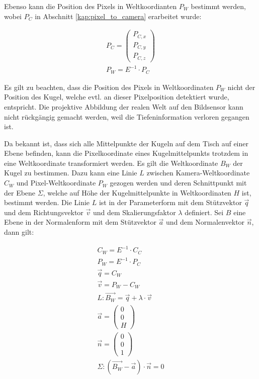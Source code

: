 Ebenso kann die Position des Pixels in Weltkoordianten $P_W$ bestimmt werden, wobei $P_C$
in Abschnitt \ref{kap:pixel_to_camera} erarbeitet wurde:

\begin{align}
P_C = \begin{pmatrix}P_{C,x}\\P_{C,y}\\P_{C,z}\end{pmatrix}\\
P_W = E^{-1} \cdot P_C
\end{align}

Es gilt zu beachten, dass die Position des Pixels in Weltkoordinaten $P_W$ nicht der Position des Kugel, welche evtl. an
dieser Pixelposition detektiert wurde, entspricht. Die projektive Abbildung der realen Welt auf den Bildsensor kann
nicht rückgängig gemacht werden, weil die Tiefeninformation verloren gegangen ist.

Da bekannt ist, dass sich alle Mittelpunkte der Kugeln auf dem Tisch auf einer Ebene befinden, kann die Pixelkoordinate
eines Kugelmittelpunkts trotzdem in eine Weltkoordinate transformiert werden.
Es gilt die Weltkoordinate $B_W$ der Kugel zu bestimmen.
Dazu kann eine Linie $L$ zwischen Kamera-Weltkoordinate $C_W$ und Pixel-Weltkoordinate $P_W$ gezogen werden und deren
Schnittpunkt mit der Ebene $\Sigma$, welche auf Höhe der Kugelmittelpunkte in Weltkoordinaten $H$ ist, bestimmt werden.
Die Linie $L$ ist in der Parameterform mit dem Stützvektor $\vec{q}$ und dem Richtungsvektor $\vec{v}$ und dem Skalierungsfaktor $\lambda$ definiert.
Sei $B$ eine Ebene in der Normalenform mit dem Stützvektor $\vec{a}$ und dem Normalenvektor $\vec{n}$, dann gilt:

\begin{align}
C_W = E^{-1} \cdot C_C\\
P_W = E^{-1} \cdot P_C\\
\vec{q} = C_W\\
\vec{v} = P_W - C_W\\
L: \vec{B_W} = \vec{q} + \lambda \cdot \vec{v}\\
\vec{a} = \begin{pmatrix}0\\0\\H\end{pmatrix}\\
\vec{n} = \begin{pmatrix}0\\0\\1\end{pmatrix}\\
\Sigma: (\vec{B_W} - \vec{a}) \cdot \vec{n} = 0\\
\end{align}

